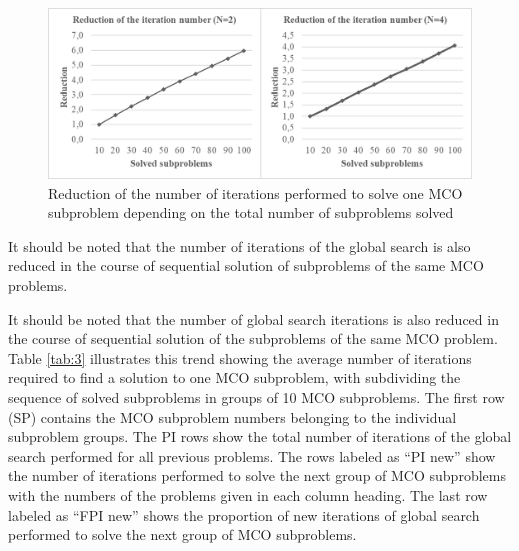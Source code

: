 \documentclass[smallextended]{svjour3}       %
\begin{document}
\begin{figure}
  \centering
  \includegraphics[width=1\linewidth]{fig5}
  \caption{Reduction of the number of iterations performed to solve one MCO subproblem depending on the total number of subproblems solved}
  \label{fig:5}
\end{figure}

It should be noted that the number of iterations of the global search is also reduced in the course of sequential solution of subproblems of the same MCO problems.

It should be noted that the number of global search iterations is also reduced in the course of sequential solution of the subproblems of the same MCO problem. Table \ref{tab:3} illustrates this trend showing the average number of iterations required to find a solution to one MCO subproblem, with subdividing the sequence of solved subproblems in groups of 10 MCO subproblems. The first row (SP) contains the MCO subproblem numbers belonging to the individual subproblem groups. The PI rows show the total number of iterations of the global search performed for all previous problems. The rows labeled as ``PI new'' show the number of iterations performed to solve the next group of MCO subproblems with the numbers of the problems given in each column heading. The last row labeled as ``FPI new'' shows the proportion of new iterations of global search performed to solve the next group of MCO subproblems.
\end{document}

